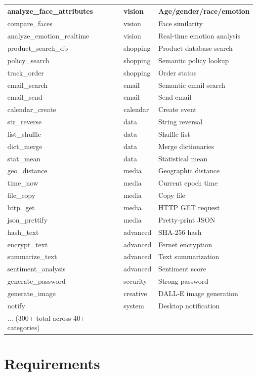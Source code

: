 \documentclass[12pt,a4paper,twoside]{report}
\begin{document}
\begin{longtable}{|l|l|l|}
\hline
analyze\_face\_attributes & vision & Age/gender/race/emotion \\
\hline
compare\_faces & vision & Face similarity \\
\hline
analyze\_emotion\_realtime & vision & Real-time emotion analysis \\
\hline
product\_search\_db & shopping & Product database search \\
\hline
policy\_search & shopping & Semantic policy lookup \\
\hline
track\_order & shopping & Order status \\
\hline
email\_search & email & Semantic email search \\
\hline
email\_send & email & Send email \\
\hline
calendar\_create & calendar & Create event \\
\hline
str\_reverse & data & String reversal \\
\hline
list\_shuffle & data & Shuffle list \\
\hline
dict\_merge & data & Merge dictionaries \\
\hline
stat\_mean & data & Statistical mean \\
\hline
geo\_distance & media & Geographic distance \\
\hline
time\_now & media & Current epoch time \\
\hline
file\_copy & media & Copy file \\
\hline
http\_get & media & HTTP GET request \\
\hline
json\_prettify & media & Pretty-print JSON \\
\hline
hash\_text & advanced & SHA-256 hash \\
\hline
encrypt\_text & advanced & Fernet encryption \\
\hline
summarize\_text & advanced & Text summarization \\
\hline
sentiment\_analysis & advanced & Sentiment score \\
\hline
generate\_password & security & Strong password \\
\hline
generate\_image & creative & DALL-E image generation \\
\hline
notify & system & Desktop notification \\
\hline
... (300+ total across 40+ categories) & & \\
\hline
\end{longtable}

\section{Requirements}
\end{document}
